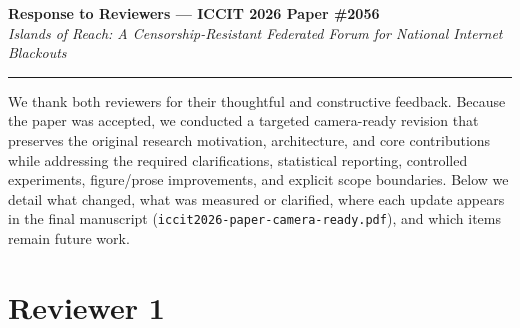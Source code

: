 \documentclass[10pt,a4paper]{article}
\begin{document}
\begin{center}
{\Large\bfseries Response to Reviewers --- ICCIT 2026 Paper \#2056}\\[3pt]
{\large\itshape Islands of Reach: A Censorship-Resistant Federated Forum for National Internet Blackouts}
\end{center}

\vspace{1pt}
\hrule
\vspace{4pt}

We thank both reviewers for their thoughtful and constructive feedback. Because the paper was accepted, we conducted a targeted camera-ready revision that preserves the original research motivation, architecture, and core contributions while addressing the required clarifications, statistical reporting, controlled experiments, figure/prose improvements, and explicit scope boundaries. Below we detail what changed, what was measured or clarified, where each update appears in the final manuscript (\texttt{iccit2026-paper-camera-ready.pdf}), and which items remain future work.

\section*{Reviewer 1}
\end{document}
